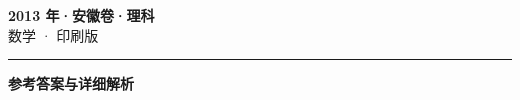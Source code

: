 \documentclass[zihao=5, a4paper]{ctexart}
\begin{document}
\begin{center}
  {\Large\bfseries 2013 年·安徽卷·理科}\\[4pt]
  {\large 数学 · 印刷版}
\end{center}
\medskip
{}

\par\bigskip\hrule\bigskip
{}
\Needspace{0.55\textheight}
\begin{center}{\large\bfseries 参考答案与详细解析}\end{center}
\smallskip

\end{document}
